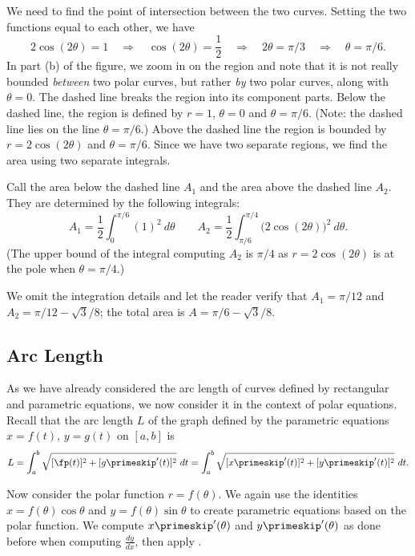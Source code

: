 {We need to find the point of intersection between the two curves. Setting the two functions equal to each other, we have
\[
2\cos(2\theta) = 1 \quad \Rightarrow \quad \cos(2\theta) = \frac12
\quad \Rightarrow \quad 2\theta = \pi/3\quad \Rightarrow \quad \theta=\pi/6.
\]
In part (b) of the figure, we zoom in on the region and note that it is not really bounded \textit{between} two polar curves, but rather \textit{by} two polar curves, along with $\theta=0$. The dashed line breaks the region into its component parts. Below the dashed line, the region is defined by $r=1$, $\theta=0$ and $\theta = \pi/6$. (Note: the dashed line lies on the line $\theta=\pi/6$.) Above the dashed line the region is bounded by $r=2\cos(2\theta)$ and $\theta =\pi/6$. Since we have two separate regions, we find the area using two separate integrals.

Call the area below the dashed line $A_1$ and the area above the dashed line $A_2$. They are determined by the following integrals:
\[
A_1 = \frac12\int_0^{\pi/6} (1)^2\ d\theta\qquad
A_2 = \frac12\int_{\pi/6}^{\pi/4} \big(2\cos(2\theta)\big)^2\ d\theta.
\]
(The upper bound of the integral computing $A_2$ is $\pi/4$ as $r=2\cos(2\theta)$ is at the pole when $\theta=\pi/4$.)

We omit the integration details and let the reader verify that $A_1 = \pi/12$ and $A_2 = \pi/12-\sqrt{3}/8$; the total area is $A = \pi/6-\sqrt{3}/8$.}

\subsection{Arc Length}

As we have already considered the arc length of curves defined by rectangular and parametric equations, we now consider it in the context of polar equations. Recall that the arc length $L$ of the graph defined by the parametric equations $x=f(t)$, $y=g(t)$ on $[a,b]$ is
\begin{equation}L = \int_a^b \sqrt{[\fp(t)]^2 + [g\primeskip'(t)]^2}\ dt = \int_a^b \sqrt{[x\primeskip'(t)]^2+[y\primeskip'(t)]^2}\ dt.\label{eq:polar_arclength}\end{equation}

Now consider the polar function $r=f(\theta)$. We again use the identities $x=f(\theta)\cos\theta$ and $y=f(\theta)\sin\theta$ to create parametric equations based on the polar function. We compute $x\primeskip'(\theta)$ and $y\primeskip'(\theta)$ as done before when computing $\frac{dy}{dx}$, then apply .


